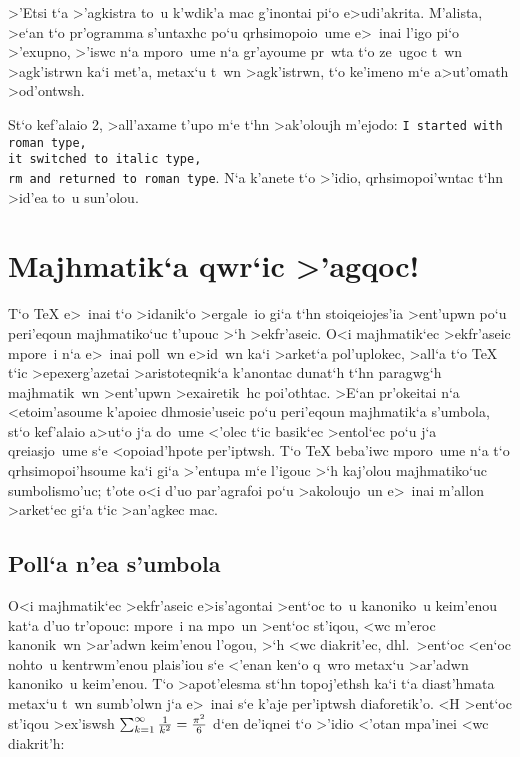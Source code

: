 \noindent  
>'Etsi t`a >'agkistra to~u k'wdik'a mac g'inontai pi`o e>udi'akrita.
M'alista, >e`an t`o pr'ogramma s'untaxhc po`u qrhsimopoio~ume e>~inai
l'igo pi`o >'exupno, >'iswc n`a mporo~ume n`a gr'ayoume pr~wta t`o
ze~ugoc t~wn >agk'istrwn ka`i met'a, metax`u t~wn >agk'istrwn, t`o
ke'imeno m`e a>ut'omath >od'ontwsh.

\exercise St`o kef'alaio 2, >all'axame t'upo m`e t`hn >ak'oloujh
m'ejodo: {\tt I started with roman type, \\it switched to italic type,
\\rm and returned to roman type}.  N`a k'a\-ne\-te t`o >'idio,
qrhsimopoi'wntac t`hn >id'ea to~u sun'olou.


\section{Majhmatik`a qwr`ic >'agqoc!}

T`o {\rm \TeX} e>~inai t`o >idanik`o >ergale~io gi`a t`hn stoiqeiojes'ia
>ent'upwn po`u peri'eqoun majhmatiko`uc t'upouc >`h >ekfr'aseic.  O<i
majhmatik`ec >ekfr'aseic mpore~i n`a e>~inai poll~wn e>id~wn ka`i
>arket`a pol'uplokec, >all`a t`o {\rm \TeX} t`ic >epexerg'azetai
>aristoteqnik`a k'anontac dunat`h t`hn paragwg`h majhmatik~wn >ent'upwn
>exairetik~hc poi'othtac. >E`an pr'okeitai n`a <etoim'asoume k'a\-poiec
dhmosie'u\-seic po`u peri'eqoun majhmatik`a s'umbola, st`o kef'alaio
a>ut`o j`a do~ume <'olec t`ic basik`ec >entol`ec po`u j`a qreiasjo~ume
s`e <opoiad'hpote per'iptwsh. T`o {\rm \TeX} beba'iwc mporo~ume n`a t`o
qrhsimopoi'hsoume ka`i gi`a >'entupa m`e l'igouc >`h kaj'olou
majhmatiko`uc sumbolismo'uc;  t'ote o<i d'uo par'agrafoi po`u
>akoloujo~un e>~inai m'allon >arket`ec gi`a t`ic >an'agkec mac.

\subsection{Poll`a n'ea s'umbola}

O<i majhmatik`ec >ekfr'aseic e>is'agontai >ent`oc to~u kanoniko~u
keim'enou kat`a d'uo tr'opouc: mpore~i na mpo~un {\tengs >ent`oc
st'iqou}, <wc m'eroc kanonik~wn >ar'adwn keim'enou l'ogou, >`h <wc {\tengs
diakrit'ec}, dhl.\ >ent`oc <en`oc nohto~u kentrwm'enou plais'iou s`e
<'enan ken`o q~wro metax`u >ar'adwn kanoniko~u keim'enou.  T`o
>apot'elesma st`hn topoj'ethsh ka`i t`a diast'hmata metax`u t~wn
sumb'olwn j`a e>~inai s`e k'aje per'iptwsh diaforetik'o.  <H >ent`oc
st'iqou >ex'iswsh  $\sum_{k=1} ^{\infty} {1\over k^2} = {\pi^2\over6}$
d`en de'iqnei t`o >'idio <'otan mpa'inei <wc diakrit'h:


